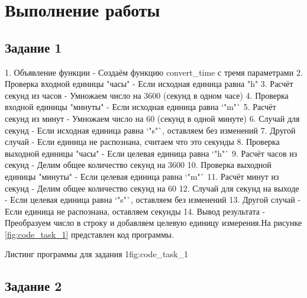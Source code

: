 \documentclass[]{vvsu}
\begin{document}
\toc

\section{Выполнение работы}

\subsection{Задание 1}

1. Объявление функции - Создаём функцию convert\_time с тремя параметрами
2. Проверка входной единицы "часы" - Если исходная единица равна "h"
3. Расчёт секунд из часов - Умножаем число на 3600 (секунд в одном часе)  
4. Проверка входной единицы "минуты" - Если исходная единица равна `"m"`  
5. Расчёт секунд из минут - Умножаем число на 60 (секунд в одной минуте)  
6. Случай для секунд - Если исходная единица равна `"s"`, оставляем без изменений  
7. Другой случай - Если единица не распознана, считаем что это секунды  
8. Проверка выходной единицы "часы" - Если целевая единица равна `"h"`  
9. Расчёт часов из секунд - Делим общее количество секунд на 3600  
10. Проверка выходной единицы "минуты" - Если целевая единица равна `"m"`  
11. Расчёт минут из секунд - Делим общее количество секунд на 60  
12. Случай для секунд на выходе - Если целевая единица равна `"s"`, оставляем без изменений  
13. Другой случай - Если единица не распознана, оставляем секунды  
14. Вывод результата - Преобразуем число в строку и добавляем целевую единицу измерения.На рисунке \ref{fig:code_task_1} представлен код программы.

\begin{vvsu_figure}{Листинг программы для задания 1}{fig:code_task_1}
  \begin{minipage}{.75\textwidth}
    
  \end{minipage}
\end{vvsu_figure}

\subsection{Задание 2}
\end{document}
